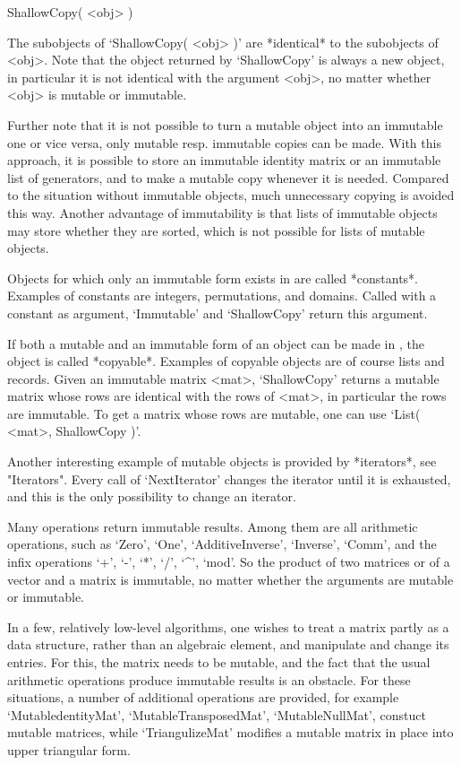 \>ShallowCopy( <obj> )

The subobjects of `ShallowCopy( <obj> )' are *identical* to the
subobjects of <obj>.
Note that the object returned by `ShallowCopy' is always a new object,
in particular it is not identical with the argument <obj>,
no matter whether <obj> is mutable or immutable.

Further note that it is not possible to turn a mutable object into an
immutable one or vice versa,
only mutable resp. immutable copies can be made.
With this approach,
it is possible to store an immutable identity matrix
or an immutable list of generators,
and to make a mutable copy whenever it is needed.
Compared to the situation without immutable objects,
much unnecessary copying is avoided this way.
Another advantage of immutability is
that lists of immutable objects may store whether they are sorted,
which is not possible for lists of mutable objects.

Objects for which only an immutable form exists in {\GAP}
are called *constants*.
Examples of constants are integers, permutations, and domains.
Called with a constant as argument,
`Immutable' and `ShallowCopy' return this argument.

If both a mutable and an immutable form of an object can be made in
{\GAP}, the object is called *copyable*.
Examples of copyable objects are of course lists and records.
Given an immutable matrix <mat>,
`ShallowCopy' returns a mutable matrix whose rows are identical with the
rows of <mat>,
in particular the rows are immutable.
To get a matrix whose rows are mutable,
one can use `List( <mat>, ShallowCopy )'.

Another interesting example of mutable objects is provided by
*iterators*, see "Iterators".
Every call of `NextIterator' changes the iterator until it is exhausted,
and this is the only possibility to change an iterator.

Many operations return immutable results.
Among them are all arithmetic operations,
such as `Zero', `One', `AdditiveInverse', `Inverse', `Comm',
and the infix operations `+', `-', `*', `/', `^', `mod'.
So the product of two matrices or of a vector and a matrix is immutable,
no matter whether the arguments are mutable or immutable.

In a few, relatively low-level algorithms, one wishes  to treat a matrix partly
as  a data structure,  rather than  an  algebraic  element, and manipulate  and
change its entries. For this, the matrix needs to be mutable, and the fact that
the usual arithmetic operations produce  immutable results is an obstacle.  For
these situations, a  number of additional  operations are provided, for example
`MutabledentityMat', `MutableTransposedMat', `MutableNullMat', constuct mutable
matrices, while `TriangulizeMat' modifies a mutable matrix  in place into upper
triangular form.

